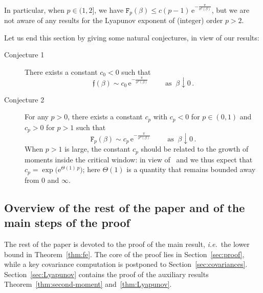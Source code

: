\documentclass[11pt]{amsart}
\numberwithin{equation}{section}
\newcommand{\e}{\mathrm{e}}
\newcommand*{\tF}{\mathtt{F}}
\newcommand*{\tf}{\mathfrak{f}}
\theoremstyle{plain}
\theoremstyle{definition}
\theoremstyle{remark}
\begin{document}
\noindent
In particular, when \(p\in (1,2]\), we have \(\tF_p(\beta) \leq c (p-1)\, \e^{-\frac{\pi}{\sigma^2(\beta)}}\), but we are not aware of any results for the Lyapunov exponent of (integer) order \(p>2\).


\smallskip

Let us end this section by giving some natural conjectures, in view of our results:
\begin{description}
       \item[Conjecture 1] There exists a constant \(c_0 <0\) such that 
       \begin{equation*}
              \tf(\beta) \sim c_0\, \e^{- \frac{\pi}{\sigma^2(\beta)}} \qquad \text{ as } \ \beta\downarrow 0\,.
       \end{equation*}

       \item[Conjecture 2] For any \(p>0\), there exists a constant \(c_p\) with \(c_p<0\) for \(p\in (0,1)\) and \(c_p>0\) for \(p>1\) such that 
       \begin{equation*}
              \tF_p(\beta) \sim c_p\, \e^{- \frac{\pi}{\sigma^2(\beta)}} \qquad \text{ as } \ \beta\downarrow 0\,.
       \end{equation*}
       When \(p>1\) is large, the constant \(c_p\) should be related to the growth of moments inside the critical window: in view of~\cite{GN25} and \cite{Raj99} we thus expect that \(c_p=\exp\big( \e^{\Theta(1) \, p}\big)\); here \(\Theta(1)\) is a quantity that remains bounded away from \(0\) and \(\infty\).
\end{description}




\subsection{Overview of the rest of the paper and of the main steps of the proof}


The rest of the paper is devoted to the proof of the main result, \textit{i.e.}\ the lower bound in Theorem~\ref{thm:fe}. 
The core of the proof lies in Section~\ref{sec:proof}, while a key covariance computation is postponed to Section~\ref{sec:covariances}.
Section~\ref{sec:Lyapunov} contains the proof of the auxiliary results Theorem~\ref{thm:second-moment} and~\ref{thm:Lyapunov}.
\end{document}
